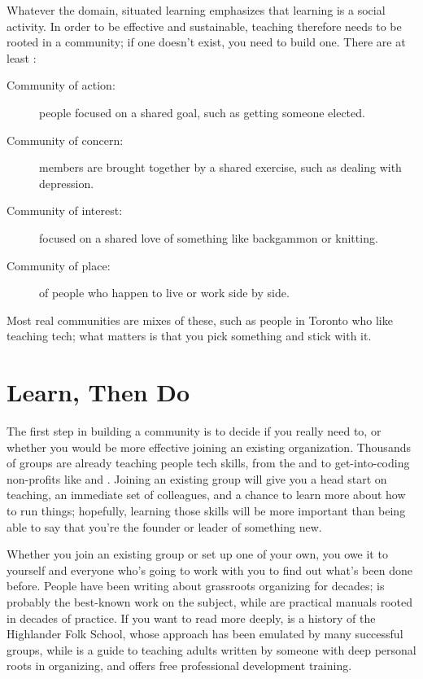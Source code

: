 Whatever the domain, situated learning emphasizes that learning is a
social activity. In order to be effective and sustainable, teaching
therefore needs to be rooted in a community; if one doesn't exist, you
need to build one. There are at least :

\begin{description}
\item[Community of action:]
people focused on a shared goal, such as getting someone elected.
\item[Community of concern:]
members are brought together by a shared exercise, such as dealing
with depression.
\item[Community of interest:]
focused on a shared love of something like backgammon or knitting.
\item[Community of place:]
of people who happen to live or work side by side.
\end{description}

Most real communities are mixes of these, such as people in Toronto who
like teaching tech; what matters is that you pick something and stick
with it.

\section{Learn, Then Do}\label{s:community-learn-then-do}

The first step in building a community is to decide if you really need
to, or whether you would be more effective joining an existing
organization. Thousands of groups are already teaching people tech
skills, from the  and  to get-into-coding non-profits like  and . Joining an
existing group will give you a head start on teaching, an immediate
set of colleagues, and a chance to learn more about how to run things;
hopefully, learning those skills will be more important than being
able to say that you're the founder or leader of something new.

Whether you join an existing group or set up one of your own, you owe
it to yourself and everyone who's going to work with you to find out
what's been done before. People have been writing about grassroots
organizing for decades; \cite{Alin1989} is probably the best-known
work on the subject, while \cite{Brow2007,Midw2010} are
practical manuals rooted in decades of practice. If you want to read
more deeply, \cite{Adam1975} is a history of the Highlander Folk
School, whose approach has been emulated by many successful groups,
while \cite{Spal2014} is a guide to teaching adults written by
someone with deep personal roots in organizing, and
 offers free professional
development training.

